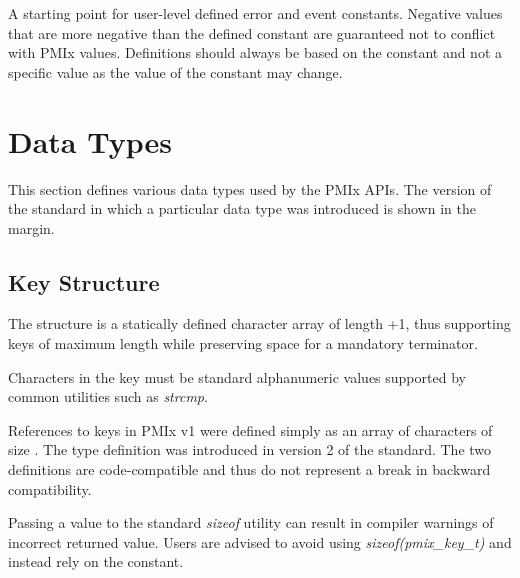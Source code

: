 \begin{constantdesc}
%
A starting point for user-level defined error and event constants.
Negative values that are more negative than the defined constant are guaranteed not to conflict with \ac{PMIx} values.
Definitions should always be based on the  constant and not a specific value as the value of the constant may change.
%
\end{constantdesc}



\section{Data Types}

This section defines various data types used by the \ac{PMIx} APIs. The version of the standard in which a particular data type was introduced is shown in the margin.

\subsection{Key Structure}

The  structure is a statically defined character array of length +1, thus supporting keys of maximum length  while preserving space for a mandatory  terminator.


Characters in the key must be standard alphanumeric values supported by common utilities such as \textit{strcmp}.

\adviceuserstart
References to keys in \ac{PMIx} v1 were defined simply as an array of characters of size . The  type definition was introduced in version 2 of the standard. The two definitions are code-compatible and thus do not represent a break in backward compatibility.

Passing a  value to the standard \textit{sizeof} utility can result in compiler warnings of incorrect returned value. Users are advised to avoid using \textit{sizeof(pmix_key_t)} and instead rely on the  constant.
\adviceuserend

